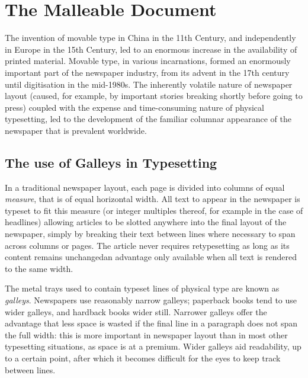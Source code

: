 \cleardoublepage
\chapter{The Malleable Document}\label{ch:malleable}  %



The invention of movable type in China in the 11th Century, and independently in Europe in the 15th Century, led to an enormous increase in the availability of printed material. Movable type, in various incarnations, formed an enormously important part of the newspaper industry, from its advent in the 17th century until digitisation in the mid-1980s. The inherently volatile nature of newspaper layout (caused, for example, by important stories breaking shortly before going to press) coupled with the expense and time-consuming nature of physical typesetting, led to the development of the familiar columnar appearance of the newspaper that is prevalent worldwide.

\section{The use of Galleys in Typesetting}
In a traditional newspaper layout, each page is divided into columns of equal \emph{measure}, that is of equal horizontal width. All text to appear in the newspaper is typeset to fit this measure (or integer multiples thereof, for example in the case of headlines) allowing articles to be slotted anywhere into the final layout of the newspaper, simply by breaking their text between lines where necessary to span across columns or pages. The article never requires retypesetting as long as its content remains unchanged\ed{}an advantage only available when all text is rendered to the same width.


The metal trays used to contain typeset lines of physical type are known as \emph{galleys}. Newspapers use reasonably narrow galleys; paperback books tend to use wider galleys, and hardback books wider still. Narrower galleys offer the advantage that less space is wasted if the final line in a paragraph does not span the full width: this is more important in newspaper layout than in most other typesetting situations, as space is at a premium. Wider galleys aid readability, up to a certain point, after which it becomes difficult for the eyes to keep track between lines.\cite{Bringhurst2008, Voorhees2011}


